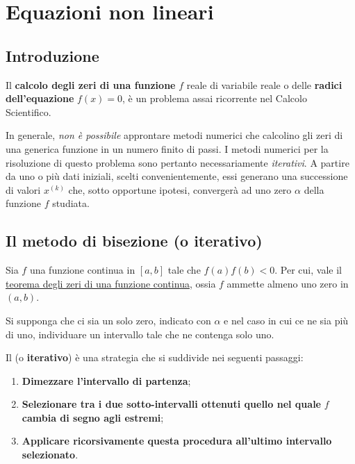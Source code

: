 \section{Equazioni non lineari}

\subsection{Introduzione}

Il \textbf{calcolo degli zeri di una funzione} $f$ reale di variabile reale o delle \textbf{radici dell'equazione} $f\left(x\right)=0$, è un problema assai ricorrente nel Calcolo Scientifico.

\highspace
In generale, \emph{non è possibile} approntare metodi numerici che calcolino gli zeri di una generica funzione in un numero finito di passi. I metodi numerici per la risoluzione di questo problema sono pertanto necessariamente \emph{iterativi}. A partire da uno o più dati iniziali, scelti convenientemente, essi generano una successione di valori $x^{\left(k\right)}$ che, sotto opportune ipotesi, convergerà ad uno zero $\alpha$ della funzione $f$ studiata.

\longline

\subsection{Il metodo di bisezione (o iterativo)}

Sia $f$ una funzione continua in $\left[a,b\right]$ tale che $f\left(a\right)f\left(b\right) < 0$. Per cui, vale il \href{https://www.youmath.it/lezioni/analisi-matematica/limiti-continuita-e-asintoti/723-teorema-degli-zeri.html}{teorema degli zeri di una funzione continua}, ossia $f$ ammette almeno uno zero in $\left(a,b\right)$.

\highspace
Si supponga che ci sia un solo zero, indicato con $\alpha$ e nel caso in cui ce ne sia più di uno, individuare un intervallo tale che ne contenga solo uno.

\highspace
Il  (o \textbf{iterativo}) è una strategia che si suddivide nei seguenti passaggi:
\begin{enumerate}
    \item \textbf{Dimezzare l'intervallo di partenza};
    \item \textbf{Selezionare tra i due sotto-intervalli ottenuti quello nel quale} $f$ \textbf{cambia di segno agli estremi};
    \item \textbf{Applicare ricorsivamente questa procedura all'ultimo intervallo selezionato}.
\end{enumerate}


